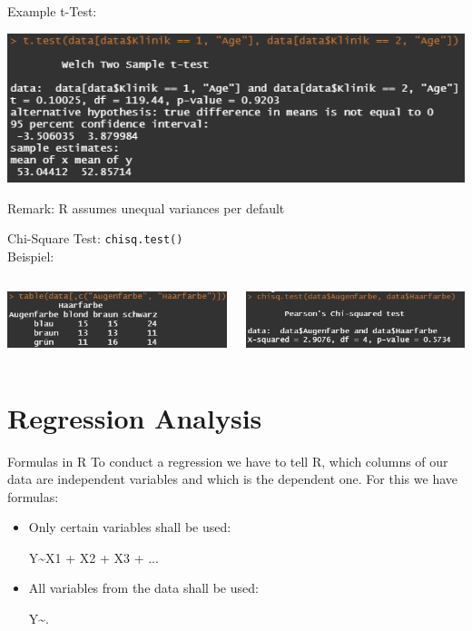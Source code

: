 \documentclass[aspectratio = 169]{chariteBeamer}
\begin{document}
\begin{frame}[fragile]{Example t-Test:}	
	\begin{center}
		\includegraphics{TwoSampleTtest}
	\end{center}
Remark: R assumes unequal variances per default
\end{frame}

\begin{frame}[fragile]{Chi-Square Test:}	
	\verb+chisq.test()+ \\

	Beispiel: \\
	\begin{columns}[T]
		\begin{column}{0.5\textwidth}
			\includegraphics[width=7.5cm]{tabledata}
		\end{column}
		\begin{column}{0.5\textwidth}
			\includegraphics[width=7.5cm]{chisq}
		\end{column}
	\end{columns}
\end{frame}


\section{Regression Analysis}

\begin{frame}[fragile]{Formulas in R}
	To conduct a regression we have to tell R, which columns of our data are independent variables and which is the dependent one. For this we have formulas:
	\begin{itemize}
		\item Only certain variables shall be used:
			\begin{center}
				Y\textasciitilde X1 + X2 + X3 + ... 
			\end{center}
		\item All variables from the data shall be used:
			\begin{center}
				Y\textasciitilde.
			\end{center}
	\end{itemize}
\end{frame}
\end{document}
